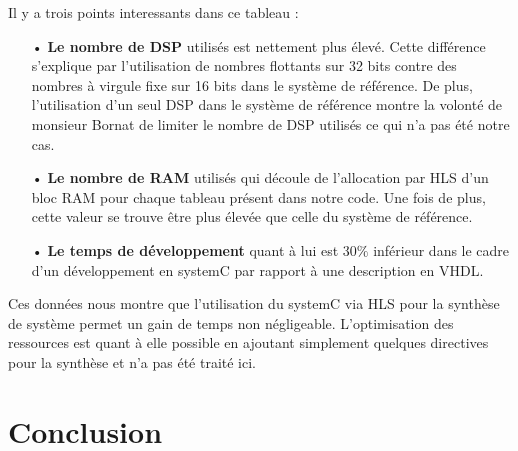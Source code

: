 \documentclass[a4paper,12pt]{article}
\begin{document}
Il y a trois points interessants dans ce tableau : 
\begin{itemize}
	\item[•] \textbf{Le nombre de DSP} utilisés est nettement plus élevé. Cette différence s'explique par l'utilisation de nombres flottants sur 32 bits contre des nombres à virgule fixe sur 16 bits dans le système de référence. De plus, l'utilisation d'un seul DSP dans le système de référence montre la volonté de monsieur Bornat de limiter le nombre de DSP utilisés ce qui n'a pas été notre cas.
	\item[•] \textbf{Le nombre de RAM} utilisés qui découle de l'allocation par HLS d'un bloc RAM pour chaque tableau présent dans notre code. Une fois de plus, cette valeur se trouve être plus élevée que celle du système de référence.
	\item[•] \textbf{Le temps de développement} quant à lui est $30\%$ inférieur dans le cadre d'un développement en systemC par rapport à une description en VHDL.
\end{itemize}
Ces données nous montre que l'utilisation du systemC via HLS pour la synthèse de système permet un gain de temps non négligeable. L'optimisation des ressources est quant à elle possible en ajoutant simplement quelques directives pour la synthèse et n'a pas été traité ici. 
\newpage
\section{Conclusion}
\end{document}
